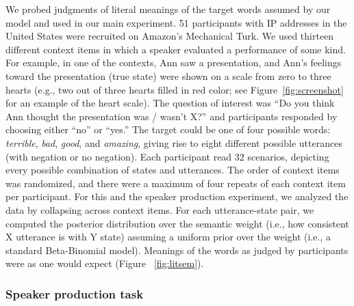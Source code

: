 \documentclass[12pt]{article}
\begin{document}
We probed judgments of literal meanings of the target words assumed by
our model and used in our main experiment. 51 participants with IP
addresses in the United States were recruited on Amazon's Mechanical
Turk. We used thirteen different context items in which a speaker
evaluated a performance of some kind. For example, in one of the
contexts, Ann saw a presentation, and Ann's feelings toward the
presentation (true state) were shown on a scale from zero to three
hearts (e.g., two out of three hearts filled in red color; see
Figure~\ref{fig:screenshot} for an example of the heart scale). The
question of interest was \enquote{Do you think Ann thought the
presentation was / wasn't X?} and participants responded by choosing
either \enquote{no} or \enquote{yes.} The target could be one of four
possible words: \emph{terrible}, \emph{bad}, \emph{good}, and
\emph{amazing}, giving rise to eight different possible utterances (with
negation or no negation). Each participant read 32 scenarios, depicting
every possible combination of states and utterances. The order of
context items was randomized, and there were a maximum of four repeats
of each context item per participant. For this and the speaker
production experiment, we analyzed the data by collapsing across context
items. For each utterance-state pair, we computed the posterior
distribution over the semantic weight (i.e., how consistent X utterance
is with Y state) assuming a uniform prior over the weight (i.e., a
standard Beta-Binomial model). Meanings of the words as judged by
participants were as one would expect (Figure ~\ref{fig:litsem}).

\subsubsection*{Speaker production task}\label{speaker-production-task}
\end{document}

